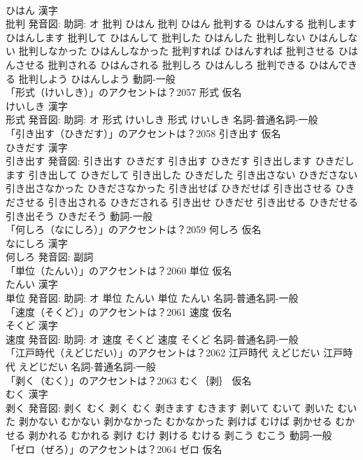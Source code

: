 \documentclass[8pt]{extreport}
\begin{document}
\begin{CJK}{UTF8}{min}
\\	ひはん 漢字　
\\	批判 発音図: 助詞: オ	批判 ひはん		批判 ひはん 批判する ひはんする 批判します ひはんします 批判して ひはんして 批判した ひはんした 批判しない ひはんしない 批判しなかった ひはんしなかった 批判すれば ひはんすれば 批判させる ひはんさせる 批判される ひはんされる 批判しろ ひはんしろ 批判できる ひはんできる 批判しよう ひはんしよう				動詞-一般 
\\	「形式（けいしき）」のアクセントは？2057	形式 仮名　
\\	けいしき 漢字　
\\	形式 発音図: 助詞: オ	形式 けいしき		形式 けいしき				名詞-普通名詞-一般 
\\	「引き出す（ひきだす）」のアクセントは？2058	引き出す 仮名　
\\	ひきだす 漢字　
\\	引き出す 発音図:	引き出す ひきだす		引き出す ひきだす 引き出します ひきだします 引き出して ひきだして 引き出した ひきだした 引き出さない ひきださない 引き出さなかった ひきださなかった 引き出せば ひきだせば 引き出させる ひきださせる 引き出される ひきだされる 引き出せ ひきだせ 引き出せる ひきだせる 引き出そう ひきだそう				動詞-一般 
\\	「何しろ（なにしろ）」のアクセントは？2059	何しろ 仮名　
\\	なにしろ 漢字　
\\	何しろ 発音図:							副詞 
\\	「単位（たんい）」のアクセントは？2060	単位 仮名　
\\	たんい 漢字　
\\	単位 発音図: 助詞: オ	単位 たんい		単位 たんい				名詞-普通名詞-一般 
\\	「速度（そくど）」のアクセントは？2061	速度 仮名　
\\	そくど 漢字　
\\	速度 発音図: 助詞: オ	速度 そくど		速度 そくど				名詞-普通名詞-一般 
\\	「江戸時代（えどじだい）」のアクセントは？2062		江戸時代 えどじだい		江戸時代 えどじだい				名詞-普通名詞-一般 
\\	「剥く（むく）」のアクセントは？2063	むく｛剥｝ 仮名　
\\	むく 漢字　
\\	剥く 発音図:	剥く むく		剥く むく 剥きます むきます 剥いて むいて 剥いた むいた 剥かない むかない 剥かなかった むかなかった 剥けば むけば 剥かせる むかせる 剥かれる むかれる 剥け むけ 剥ける むける 剥こう むこう				動詞-一般 
\\	「ゼロ（ぜろ）」のアクセントは？2064	ゼロ 仮名　

\end{CJK}
\end{document}
